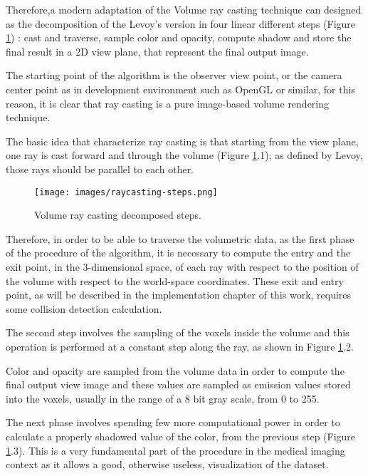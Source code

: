 \documentclass[12pt,a4paper]{extarticle}
\newcommand{\linespace}{\vspace{8pt}}
\begin{document}
Therefore,a modern adaptation of the Volume ray casting technique can designed as the decomposition of the Levoy's version in four linear different steps (Figure \ref{fig:raycastingsteps}) %
: cast and traverse, sample color and opacity, compute shadow and store the final result in a 2D view plane, that represent the final output image.



The starting point of the algorithm is the observer view point, or the camera center point as in development environment such as OpenGL or similar, for this reason, it is clear that ray casting is a pure image-based volume rendering technique.
\linespace

The basic idea that characterize ray casting is that starting from the view plane, one ray is cast forward and through the volume (Figure \ref{fig:raycastingsteps}.1); as defined by Levoy, those rays should be parallel to each other.

\begin{figure}[hbtp]
\centering
\texttt{[image: images/raycasting-steps.png]}
\caption{Volume ray casting decomposed steps.}
\label{fig:raycastingsteps}
\end{figure}

Therefore, in order to be able to traverse the volumetric data, as the first phase of the procedure of the algorithm, it is necessary to compute the entry and the exit point, in the 3-dimensional space, of each ray with respect to the position of the volume with respect to the world-space coordinates. %
These exit and entry point, as will be described in the implementation chapter of this work, requires some collision detection calculation. 
\linespace

The second step involves the sampling of the voxels inside the volume and this operation is performed at a constant step along the ray, as shown in Figure \ref{fig:raycastingsteps}.2.

Color and opacity are sampled from the volume data in order to compute the final output view image and these values are sampled as emission values stored into the voxels, usually in the range of a 8 bit gray scale, from 0 to 255.
\linespace

The next phase involves spending few more computational power in order to calculate a properly shadowed value of the color, from the previous step (Figure \ref{fig:raycastingsteps}.3). This is a very fundamental part of the procedure in the medical imaging context as it allows a good, otherwise useless, visualization of the dataset.
\end{document}
